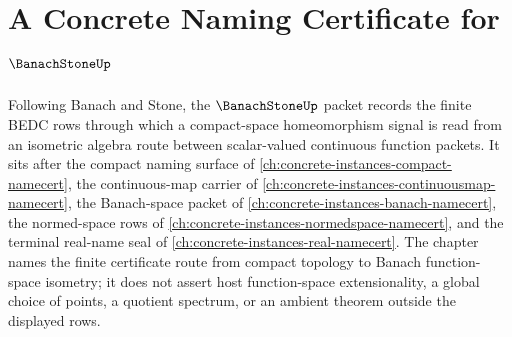 \chapter{A Concrete Naming Certificate for $\BanachStoneUp$}
\label{ch:concrete-instances-banach-stone-namecert}

Following Banach and Stone, the $\BanachStoneUp$ packet records the finite BEDC rows through which a compact-space homeomorphism signal is read from an isometric algebra route between scalar-valued continuous function packets. It sits after the compact naming surface of \autoref{ch:concrete-instances-compact-namecert}, the continuous-map carrier of \autoref{ch:concrete-instances-continuousmap-namecert}, the Banach-space packet of \autoref{ch:concrete-instances-banach-namecert}, the normed-space rows of \autoref{ch:concrete-instances-normedspace-namecert}, and the terminal real-name seal of \autoref{ch:concrete-instances-real-namecert}. The chapter names the finite certificate route from compact topology to Banach function-space isometry; it does not assert host function-space extensionality, a global choice of points, a quotient spectrum, or an ambient theorem outside the displayed rows.

